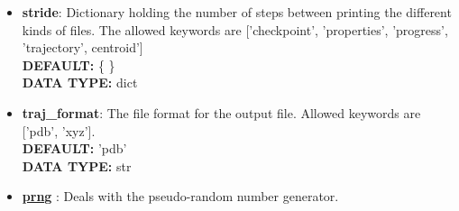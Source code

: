 \begin{itemize}
\begin{itemize}
{\\ \bf DEFAULT: }
      [[ 0.  0.  0.]
       [ 0.  0.  0.]
       [ 0.  0.  0.]]
{\\ \bf DATA TYPE: }float
\item {\bf h0}:
 The reference cell vector matrix. Defined as the unstressed equilibrium cell.
{\\ \bf DIMENSION: }length
{\\ \bf DEFAULT: }
      [[ 0.  0.  0.]
       [ 0.  0.  0.]
       [ 0.  0.  0.]]
{\\ \bf DATA TYPE: }float
\item {\bf m}:
 The 'mass' of the cell, used in constant pressure simulations.
{\\ \bf DIMENSION: }mass
{\\ \bf DEFAULT: }0.0
{\\ \bf DATA TYPE: }float
\end{itemize}
 
\item {\bf stride}:
 Dictionary holding the number of steps between printing the different kinds of files. The allowed keywords are ['checkpoint', 'properties', 'progress', 'trajectory', centroid']
{\\ \bf DEFAULT: }\{ \}
{\\ \bf DATA TYPE: }dict
\item {\bf traj\_format}:
 The file format for the output file. Allowed keywords are ['pdb', 'xyz'].
{\\ \bf DEFAULT: }'pdb'
{\\ \bf DATA TYPE: }str
\item {\bf \hyperref[RANDOM]{prng} }:
 Deals with the pseudo-random number generator.

\end{itemize}

